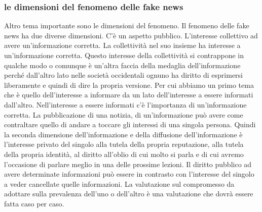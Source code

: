 \subsubsection{le dimensioni del fenomeno delle fake news}
Altro tema importante sono le dimensioni del fenomeno. Il fenomeno delle fake news ha due diverse dimensioni.
C'è un aspetto pubblico. L'interesse collettivo ad avere un'informazione corretta. La collettività nel suo insieme ha interesse a un'informazione corretta. Questo interesse della collettività si contrappone in qualche modo o comunque è un'altra faccia della medaglia dell'informazione perché dall'altro lato nelle società occidentali ognuno ha diritto di esprimersi liberamente e quindi di dire la propria versione. 
Per cui abbiamo un primo tema che è quello dell'interesse a informare da un lato dell'interesse a essere informati dall'altro. Nell'interesse a essere informati c'è l'importanza di un'informazione corretta. 
La pubblicazione di una notizia, di un'informazione può avere come contraltare quello di andare a toccare gli interessi di una singola persona. Quindi la seconda dimensione dell'informazione e della diffusione dell'informazione è l'interesse privato del singolo alla tutela della propria reputazione, alla tutela della propria identità, al diritto all'oblio di cui molto si parla e di cui avremo l'occasione di parlare meglio in una delle prossime lezioni. 
Il diritto pubblico ad avere determinate informazioni può essere in contrasto con l'interesse del singolo a veder cancellate quelle informazioni. La valutazione sul compromesso da adottare sulla prevalenza dell'uno o dell'altro è una valutazione che dovrà essere fatta caso per caso. 

